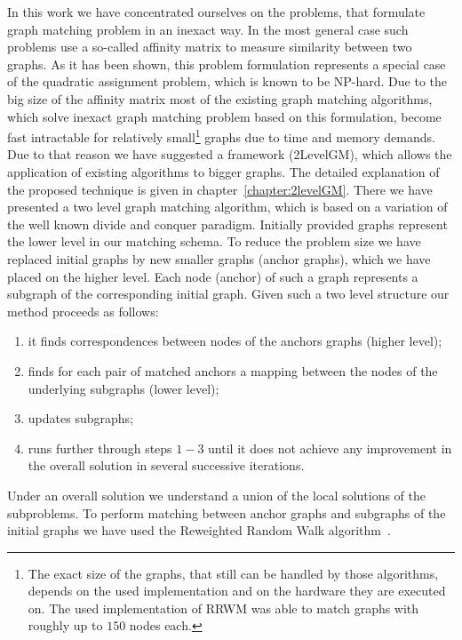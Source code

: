 In this work we have concentrated ourselves on the problems, that formulate graph matching problem in an inexact way. 
In the most general case such problems use a so-called affinity matrix to measure similarity between two graphs. 
As it has been shown, this problem formulation represents a special case of the quadratic assignment problem, which is known to be NP-hard. Due to the big size of the affinity matrix most of the existing graph matching algorithms, which solve inexact graph matching problem based on this formulation, become fast intractable for relatively small\footnote{The exact size of the graphs, that still can be handled by those algorithms, depends on the used implementation and on the hardware they are executed on. The used implementation of RRWM was able to match graphs with roughly up to $150$ nodes each.} graphs due to time and memory demands. Due to that reason we have suggested a framework (2LevelGM), which allows the application of existing algorithms to bigger graphs. The detailed explanation of the proposed technique is given in chapter~\ref{chapter:2levelGM}. There we have presented a two level graph matching algorithm, which is based on a variation of the well known divide and conquer paradigm. Initially provided graphs represent the lower level in our matching schema. To reduce the problem size we have replaced initial graphs by new smaller graphs (anchor graphs), which we have placed on the higher level. Each node (anchor) of such a graph represents a subgraph of the corresponding initial graph. Given such a two level structure our method proceeds as follows:
\begin{enumerate}
\item it finds correspondences between nodes of the anchors graphs (higher level);
\item finds for each pair of matched anchors a mapping between the nodes of the underlying subgraphs (lower level);
\item updates subgraphs;
\item runs further through steps $1-3$ until it does not achieve any improvement in the overall solution in several successive iterations.
\end{enumerate}
Under an overall solution we understand a union of the local solutions of the subproblems. To perform matching between anchor graphs and subgraphs of the initial graphs we have used the Reweighted Random Walk algorithm~\cite{Cho2010_RRWM}.

